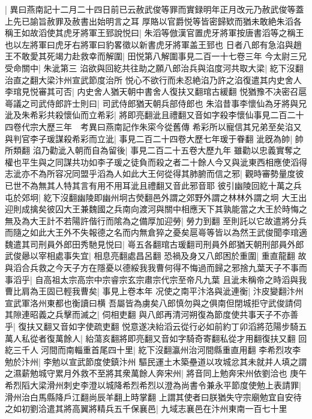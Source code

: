 |{
	異曰燕南記十二月二十四日前已云赦武俊等罪而實録明年正月改元乃赦武俊等蓋上先已諭旨赦罪及赦書出始明言之耳}
厚賂以官爵悦等皆密歸欵而猶未敢絶朱滔各稱王如故滔使其虎牙將軍王郅說悦曰|{
	朱滔等倣漢官置虎牙將軍按唐書滔等之稱王也以左將軍曰虎牙右將軍曰豹畧徵以新書虎牙將軍盖王郅也}
日者八郎有急淊與趙王不敢愛其死竭力赴救幸而解圍|{
	田悦第八解圍事見二百一十七卷三年}
今太尉三兄受命關中|{
	朱泚第三}
淊欲與回紇共往助之願八郎治兵與淊度河共取大梁|{
	紇下沒翻治直之翻大梁汴州宣武節度治所}
悦心不欲行而未忍絶淊乃許之淊復遣其内史舍人李琯見悦審其可否|{
	内史舍人猶天朝中書舍人復扶又翻琯古緩翻}
悦猶豫不决密召扈㠋議之司武侍郎許士則曰|{
	司武侍郎猶天朝兵部侍郎也}
朱淊昔事李懷仙為牙將與兄泚及朱希彩共殺懷仙而立希彩|{
	將即亮翻泚且禮翻又音如字殺李懷仙事見二百二十四卷代宗大歷三年　考異曰燕南記作朱寀今從舊傳}
希彩所以寵信其兄弟至矣淊又與判官李子瑗謀殺希彩而立泚|{
	事見二百二十四卷大歷七年瑗于眷翻}
泚旣為帥|{
	帥所類翻}
淊乃勸泚入朝而自為留後|{
	事見二百二十五卷大歷九年}
雖勸以忠義實奪之權也平生與之同謀共功如李子瑗之徒負而殺之者二十餘人今又與泚東西相應使滔得志泚亦不為所容况同盟乎滔為人如此大王何從得其肺腑而信之邪|{
	觀時審勢量度彼已世不為無其人特其言有用不用耳泚且禮翻又音此邪音耶}
彼引幽陵回紇十萬之兵屯於郊坰|{
	紇下沒翻幽陵即幽州坰古熒翻邑外謂之郊野外謂之林林外謂之坰}
大王出迎則成擒矣彼囚大王兼魏國之兵南向渡河與關中相應天下其孰能當之大王於時悔之無及為大王計不若陽許偕行而隂為之備厚加迎勞|{
	勞力到翻}
至則託以它故遣將分兵而隨之如此大王外不失報德之名而内無倉猝之憂矣扈㠋等皆以為然王武俊聞李琯適魏遣其司刑員外郎田秀馳見悦曰|{
	㠋五各翻琯古瑗翻司刑員外郎猶天朝刑部員外郎}
武俊曏以宰相處事失宜|{
	相息亮翻處昌呂翻}
恐禍及身又八郎困於重圍|{
	重直龍翻}
故與滔合兵救之今天子方在隱憂以德綏我我曹何得不悔過而歸之邪捨九葉天子不事而事滔乎|{
	自高祖太宗高宗中宗睿宗玄宗肅宗代宗至帝凡九葉}
且泚未稱帝之時滔與我曹比肩為王固已輕我曹矣|{
	事見上卷本年}
况使之南平汴洛與泚連衡|{
	汴皮變翻汴州宣武軍洛州東都也衡讀曰横}
吾屬皆為虜矣八郎慎勿與之俱南但閉城拒守武俊請伺其隙連昭義之兵擊而滅之|{
	伺相吏翻}
與八郎再清河朔復為節度使共事天子不亦善乎|{
	復扶又翻又音如字使疏吏翻}
悦意遂决紿滔云從行必如前約丁卯滔將范陽步騎五萬人私從者復萬餘人|{
	紿蕩亥翻將即亮翻又音如字騎奇寄翻私從才用翻復扶又翻}
回紇三千人河間而南輜重首尾四十里|{
	紇下沒翻瀛州治河間縣重直用翻}
李希烈攻李勉於汴州|{
	李勉以宣武節度使鎮汴州}
驅民運土木築壘道以攻城忿其未就并人填之謂之濕薪勉城守累月外救不至將其衆萬餘人奔宋州|{
	將音同上勉奔宋州依劉洽也}
庚午希烈䧟大梁滑州刺史李澄以城降希烈希烈以澄為尚書令兼永平節度使勉上表請罪|{
	滑州治白馬縣降戶江翻尚辰羊翻上時掌翻}
上謂其使者曰朕猶失守宗廟勉宜自安待之如初劉洽遣其將高翼將精兵五千保襄邑|{
	九域志襄邑在汴州東南一百七十里}

